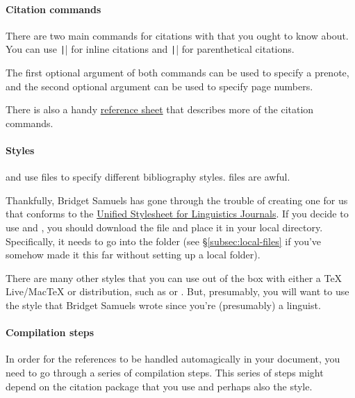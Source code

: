 \paragraph{Citation commands}

There are two main commands for citations with  that you ought to know about.
You can use \texttt|\citet[][]{...}| for inline citations and \texttt|\citep[][]{...}| for parenthetical citations.

The first optional argument of both commands can be used to specify a prenote, and the second optional argument can be used to specify page numbers.

There is also a handy \href{http://merkel.zoneo.net/Latex/natbib.php}{ reference sheet} that describes more of the citation commands.

\paragraph{Styles}

 and  use  files to specify different bibliography styles.
 files are awful.

Thankfully, Bridget Samuels has gone through the trouble of creating one for us that conforms to the \href{http://celxj.org/downloads/UnifiedStyleSheet.pdf}{Unified Stylesheet for Linguistics Journals}.
If you decide to use  and , you should download the file \href{http://celxj.org/downloads/unified.bst}{} and place it in your local  directory.
Specifically, it needs to go into the folder  (see \S\ref{subsec:local-files} if you've somehow made it this far without setting up a local  folder).

There are many other styles that you can use out of the box with either a TeX Live/{Mac\TeX} or  distribution, such as  or .
But, presumably, you will want to use the  style that Bridget Samuels wrote since you're (presumably) a linguist.

\paragraph{Compilation steps}

In order for the references to be handled automagically in your document, you need to go through a series of compilation steps.
This series of steps might depend on the citation package that you use and perhaps also the style.

